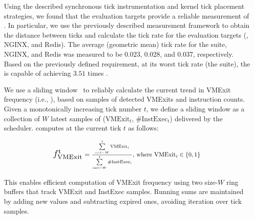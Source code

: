 Using the described synchronous tick instrumentation and kernel tick placement strategies, we found that the evaluation targets provide a reliable measurement of \freqvmexit.
In particular, we use the previously described measurement framework to obtain the distance between ticks and calculate the tick rate for the evaluation targets (\nbench, NGINX, and Redis).
The average (geometric mean) tick rate for the \nbench suite, NGINX, and Redis was measured to be $0.023$, $0.028$, and $0.037$, respectively.
Based on the previously defined requirement, at its worst tick rate (the \nbench suite), the \thename is capable of achieving $3.51$ times .




\label{subsec:sliding-window}
We use a sliding window~\cite{deeprest,sliding-window} to reliably calculate the current trend in VMExit frequency (i.e., \freqvmexitof{}), based on samples of detected VMExits and instruction counts.
Given a monotonically increasing tick number $t$, we define a sliding window as a collection of $W$ latest samples of ($\text{VMExit}_t$, \#$\text{InstExec}_t$) delivered by the scheduler.
\thename computes  at the current tick $t$ as follows:
{\small
\begin{equation*}
	\scalebox{1.3}{\freqvmexitof{t}} = \scalebox{0.9}{\ensuremath{\frac{{\sum\limits_{i=t-W}^t \text{VMExit}_i}}  {{\sum\limits_{i=t-W}^t \# \text{InstExec}_i}} \\ \text{, where } \text{VMExit}_i \in \{0, 1\}}}
\end{equation*}

}
This enables efficient computation of VMExit frequency using two size-$W$ ring buffers that track VMExit and InstExec samples.
Running sums are maintained by adding new values and subtracting expired ones, avoiding iteration over tick samples.

